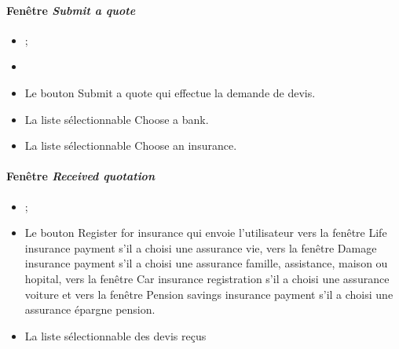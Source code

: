 \paragraph{Fenêtre \emph{Submit a quote}}
\begin{itemize}
\item {} ;
\item {}
\item Le bouton Submit a quote qui effectue la demande de devis.
\item La liste sélectionnable Choose a bank.
\item La liste sélectionnable Choose an insurance.
\end{itemize}


\paragraph{Fenêtre \emph{Received quotation}}
\begin{itemize}
\item {} ;
\item Le bouton Register for insurance qui envoie l'utilisateur vers la fenêtre Life insurance payment s'il a choisi une assurance vie, vers la fenêtre Damage insurance payment s'il a choisi une assurance famille, assistance, maison ou hopital, vers la fenêtre Car insurance registration s'il a choisi une assurance voiture et vers la fenêtre Pension savings insurance payment s'il a choisi une assurance épargne pension.
\item La liste sélectionnable des devis reçus
\end{itemize}


